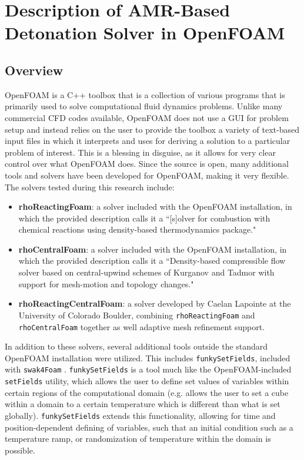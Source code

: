 \chapter{Description of AMR-Based Detonation Solver in OpenFOAM}
\label{math}

\section{Overview}
OpenFOAM is a C++ toolbox that is a collection of various programs that is primarily used to solve computational fluid dynamics problems. Unlike many commercial CFD codes available, OpenFOAM does not use a GUI for problem setup and instead relies on the user to provide the toolbox a variety of text-based input files in which it interprets and uses for deriving a solution to a particular problem of interest. This is a blessing in disguise, as it allows for very clear control over what OpenFOAM does. Since the source is open, many additional tools and solvers have been developed for OpenFOAM, making it very flexible. The solvers tested during this research include:
\begin{itemize}
    \item \textbf{rhoReactingFoam}: a solver included with the OpenFOAM installation, in which the provided description calls it a ``[s]olver for combustion with chemical reactions using density-based thermodynamics package."
    \item \textbf{rhoCentralFoam}: a solver included with the OpenFOAM installation, in which the provided description calls it a ``Density-based compressible flow solver based on central-upwind schemes of Kurganov and Tadmor with support for mesh-motion and topology changes."
    \item \textbf{rhoReactingCentralFoam}: a solver developed by Caelan Lapointe at the University of Colorado Boulder, combining \verb|rhoReactingFoam| and \verb|rhoCentralFoam| together as well adaptive mesh refinement support. 
\end{itemize}

In addition to these solvers, several additional tools outside the standard OpenFOAM installation were utilized. This includes \verb|funkySetFields|, included with \verb|swak4Foam| \cite{swak4foam}. \verb|funkySetFields| is a tool much like the OpenFOAM-included \verb|setFields| utility, which allows the user to define set values of variables within certain regions of the computational domain (e.g. allows the user to set a cube within a domain to a certain temperature which is different than what is set globally). \verb|funkySetFields| extends this functionality, allowing for time and position-dependent defining of variables, such that an initial condition such as a temperature ramp, or randomization of temperature within the domain is possible. 

